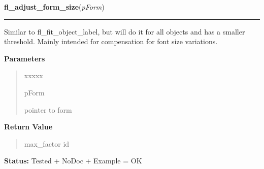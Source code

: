 \hspace{.8\funcindent}\begin{boxedminipage}{\funcwidth}

    \raggedright \textbf{fl\_adjust\_form\_size}(\textit{pForm})

    \vspace{-1.5ex}

    \rule{\textwidth}{0.5\fboxrule}
\setlength{\parskip}{2ex}
    Similar to fl\_fit\_object\_label, but will do it for all objects and 
    has a smaller threshold. Mainly intended for compensation for font size
    variations.

\setlength{\parskip}{1ex}
      \textbf{Parameters}
      \vspace{-1ex}

      \begin{quote}
        \begin{Ventry}{xxxxx}

          \item[pForm]

          pointer to form

        \end{Ventry}

      \end{quote}

      \textbf{Return Value}
    \vspace{-1ex}

      \begin{quote}
      max\_factor id

      \end{quote}

\textbf{Status:} Tested + NoDoc + Example = OK



    \end{boxedminipage}

    \label{xformslib:library:fl_form_is_visible}

    \vspace{0.5ex}

